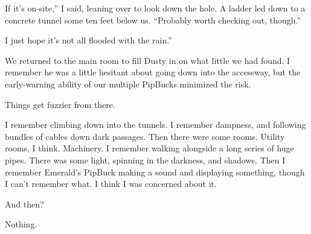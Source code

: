 \leavevmode{}If it’s on-site,” I said, leaning over to look down the hole. A ladder led down to a concrete tunnel some ten feet below us. “Probably worth checking out, though.”

\leavevmode{}I just hope it’s not all flooded with the rain.”

We returned to the main room to fill Dusty in on what little we had found. I remember he was a little hesitant about going down into the accessway, but the early-warning ability of our multiple PipBucks minimized the risk.

Things get fuzzier from there.

I remember climbing down into the tunnels. I remember dampness, and following bundles of cables down dark passages. Then there were some rooms. Utility rooms, I think. Machinery. I remember walking alongside a long series of huge pipes. There was some light, spinning in the darkness, and shadows. Then I remember Emerald’s PipBuck making a sound and displaying something, though I can’t remember what. I think I was concerned about it.

And then?

Nothing.